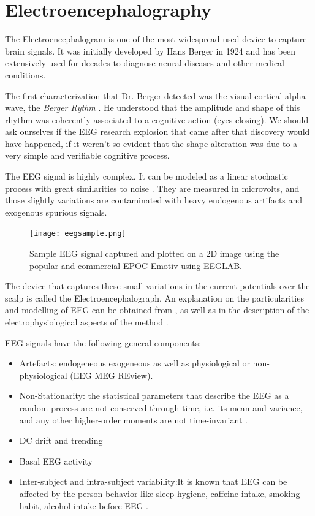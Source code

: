 \documentclass[sensors,article,submit,moreauthors,pdftex,10pt,a4paper]{mdpi}
\begin{document}
\section{Electroencephalography}

The Electroencephalogram is one of the most widespread used device to capture brain signals.  It was initially developed by Hans Berger in 1924 and has been extensively used for decades to diagnose neural diseases and other medical conditions.

The first characterization that Dr. Berger detected was the visual cortical alpha wave, the \textit{Berger Rythm} \citep{Jansen1991}.  He understood that the amplitude and shape of this rhythm was coherently associated to a cognitive action (eyes closing).  
We should ask ourselves if the EEG research explosion that came after that discovery would have happened, if it weren't so evident that the shape alteration was due to a very simple and verifiable cognitive process.

The EEG signal is highly complex.  It can be modeled as a linear stochastic process with great similarities to noise \citep{Thakor2004}.  They are measured in microvolts, and those slightly variations are contaminated with heavy endogenous artifacts and exogenous spurious signals.  
 
\begin{figure}[H]
\centering
\texttt{[image: eegsample.png]}
\caption{Sample EEG signal captured and plotted on a 2D image using the popular and commercial EPOC Emotiv using EEGLAB.}
\label{fig:sampleeeg}
\end{figure}

The device that captures these small variations in the current potentials over the scalp is called the Electroencephalograph.  An  explanation on the particularities and modelling of EEG can be obtained from \citep{Jackson2014}, as well as in the description of the electrophysiological aspects of the method \citep{Haberman2012}.

EEG signals have the following general components:

\begin{itemize}
\item Artefacts: endogeneous exogeneous as well as physiological or non-physiological (EEG MEG REview).
\item Non-Stationarity: the statistical parameters that describe the EEG as a random process are not conserved through time, i.e. its mean and variance, and any other higher-order moments are not time-invariant \citep{Jansen1991}.
\item DC drift and trending
\item Basal EEG activity
\item Inter-subject and intra-subject variability:It is known that EEG can be affected by the person behavior like sleep hygiene, caffeine intake, smoking habit, alcohol intake before EEG \citep{Farzan2017}.
\end{itemize}
\end{document}
